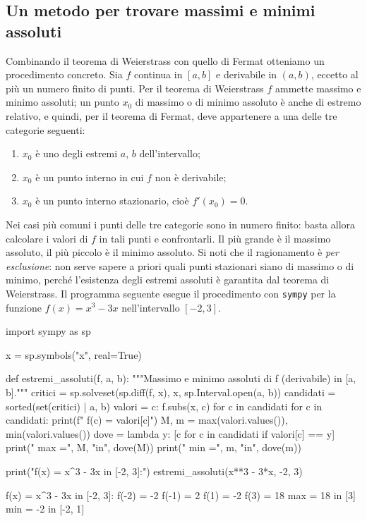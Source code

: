 \subsection{Un metodo per trovare massimi e minimi assoluti}

Combinando il teorema di Weierstrass con quello di Fermat otteniamo un procedimento
concreto. Sia $f$ continua in $[a,b]$ e derivabile in $(a,b)$, eccetto al più un numero
finito di punti. Per il teorema di Weierstrass $f$ ammette massimo e minimo assoluti;
un punto $x_{0}$ di massimo o di minimo assoluto è anche di estremo relativo, e
quindi, per il teorema di Fermat, deve appartenere a una delle tre categorie seguenti:
\begin{enumerate}[label=\textup{(\roman*)}]
  \item $x_{0}$ è uno degli estremi $a$, $b$ dell'intervallo;
  \item $x_{0}$ è un punto interno in cui $f$ non è derivabile;
  \item $x_{0}$ è un punto interno stazionario, cioè $f'(x_{0})=0$.
\end{enumerate}
Nei casi più comuni i punti delle tre categorie sono in numero finito: basta allora
calcolare i valori di $f$ in tali punti e confrontarli. Il più grande è il massimo
assoluto, il più piccolo è il minimo assoluto. Si noti che il ragionamento è
\emph{per esclusione}: non serve sapere a priori quali punti stazionari siano di
massimo o di minimo, perché l'esistenza degli estremi assoluti è garantita dal teorema
di Weierstrass. Il programma seguente esegue il procedimento con \texttt{sympy} per la
funzione $f(x)=x^{3}-3x$ nell'intervallo $[-2,3]$.

\begin{python}
import sympy as sp

x = sp.symbols("x", real=True)

def estremi_assoluti(f, a, b):
    """Massimo e minimo assoluti di f (derivabile) in [a, b]."""
    critici = sp.solveset(sp.diff(f, x), x, sp.Interval.open(a, b))
    candidati = sorted(set(critici) | {a, b})
    valori = {c: f.subs(x, c) for c in candidati}
    for c in candidati:
        print(f"  f({c}) = {valori[c]}")
    M, m = max(valori.values()), min(valori.values())
    dove = lambda y: [c for c in candidati if valori[c] == y]
    print("  max =", M, "in", dove(M))
    print("  min =", m, "in", dove(m))

print("f(x) = x^3 - 3x in [-2, 3]:")
estremi_assoluti(x**3 - 3*x, -2, 3)
\end{python}
\begin{risultato}
f(x) = x^3 - 3x in [-2, 3]:
  f(-2) = -2
  f(-1) = 2
  f(1) = -2
  f(3) = 18
  max = 18 in [3]
  min = -2 in [-2, 1]
\end{risultato}

